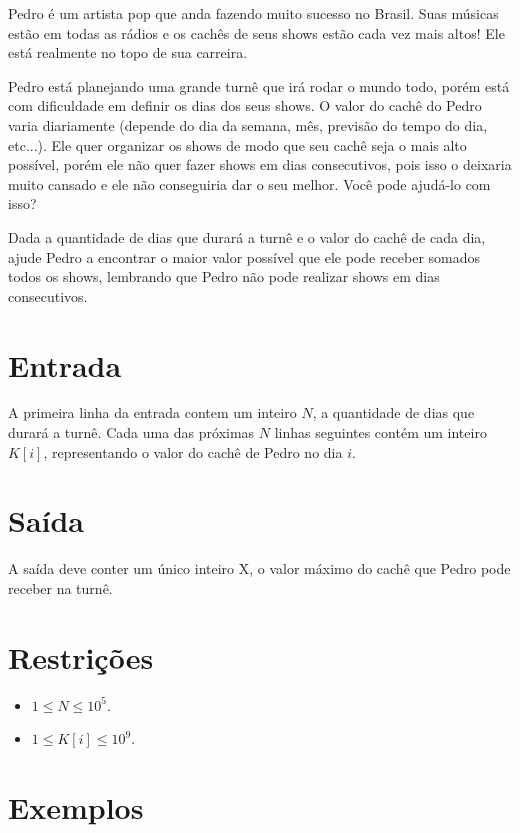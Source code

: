 Pedro é um artista pop que anda fazendo muito sucesso no Brasil. Suas músicas estão em todas as rádios e os cachês de seus shows estão cada vez mais altos! Ele está realmente no topo de sua carreira.

Pedro está planejando uma grande turnê que irá rodar o mundo todo, porém está com dificuldade em definir os dias dos seus shows. O valor do cachê do Pedro varia diariamente (depende do dia da semana, mês, previsão do tempo do dia, etc...). Ele quer organizar os shows de modo que seu cachê seja o mais alto possível, porém ele não quer fazer shows em dias consecutivos, pois isso o deixaria muito cansado e ele não conseguiria dar o seu melhor.  Você pode ajudá-lo com isso?

Dada a quantidade de dias que durará a turnê e o valor do cachê de cada dia, ajude Pedro a encontrar o maior valor possível que ele pode receber somados todos os shows, lembrando que Pedro não pode realizar shows em dias consecutivos.

\section*{Entrada}

A primeira linha da entrada contem um inteiro $N$, a quantidade de dias que durará a turnê. Cada uma das próximas $N$ linhas seguintes contém um inteiro $K[i]$, representando o valor do cachê de Pedro no dia $i$.

\section*{Saída}

A saída deve conter um único inteiro X, o valor máximo do cachê que Pedro pode receber na turnê.

\section*{Restrições}

\begin{itemize}
\item $1 \leq N \leq 10^5$.
\item $1 \leq K[i] \leq 10^9$.
\end{itemize}


\section*{Exemplos}

\exemplo
